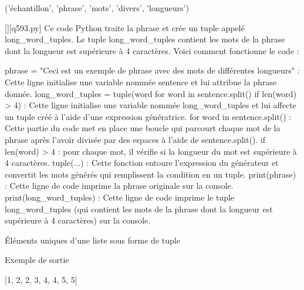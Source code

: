 ('échantillon', 'phrase', 'mots', 'divers', 'longueurs')
        \par
        \begin{solution}
            \renewcommand{\nomfichier}{q593.py}
            \pythonfile{\chemincode \nomfichier}[][\nomfichier]
            Ce code Python traite la phrase et crée un tuple appelé long\_word\_tuples. Le tuple long\_word\_tuples contient les mots de la phrase dont la longueur est supérieure à 4 caractères. Voici comment fonctionne le code :

    phrase = "Ceci est un exemple de phrase avec des mots de différentes longueurs" : Cette ligne initialise une variable nommée sentence et lui attribue la phrase donnée.
    long\_word\_tuples = tuple(word for word in sentence.split() if len(word) > 4) : Cette ligne initialise une variable nommée long\_word\_tuples et lui affecte un tuple créé à l'aide d'une expression génératrice.
        for word in sentence.split() : Cette partie du code met en place une boucle qui parcourt chaque mot de la phrase après l'avoir divisée par des espaces à l'aide de sentence.split().
        if len(word) > 4 : pour chaque mot, il vérifie si la longueur du mot est supérieure à 4 caractères.
        tuple(...) : Cette fonction entoure l'expression du générateur et convertit les mots générés qui remplissent la condition en un tuple.
    print(phrase) : Cette ligne de code imprime la phrase originale sur la console.
    print(long\_word\_tuples) : Cette ligne de code imprime le tuple long\_word\_tuples (qui contient les mots de la phrase dont la longueur est supérieure à 4 caractères) sur la console.
        \end{solution}
        

        \question
        Éléments uniques d'une liste sous forme de tuple

Exemple de sortie

[1, 2, 2, 3, 4, 4, 5, 5]

